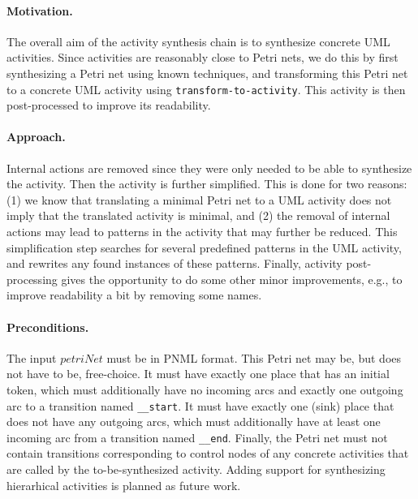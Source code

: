 \documentclass{article}
\newcommand{\keyw}[1]{\texttt{#1}}
\newcommand{\var}[1]{\ensuremath{\mathit{#1}}}
\newcommand{\transformToActivityLabel}[0]{\keyw{transform-to-activity}}
\newcommand{\startLabel}[0]{\texttt{\_\_start}}
\newcommand{\stopLabel}[0]{\texttt{\_\_end}} %
\theoremstyle{definition}
\begin{document}
\paragraph{Motivation.}
The overall aim of the activity synthesis chain is to synthesize concrete UML activities.
Since activities are reasonably close to Petri nets, we do this by first synthesizing a Petri net using known techniques, and transforming this Petri net to a concrete UML activity using \transformToActivityLabel{}.
This activity is then post-processed to improve its readability.

\paragraph{Approach.}
Internal actions are removed since they were only needed to be able to synthesize the activity.
Then the activity is further simplified.
This is done for two reasons: (1) we know that translating a minimal Petri net to a UML activity does not imply that the translated activity is minimal, and (2) the removal of internal actions may lead to patterns in the activity that may further be reduced.
This simplification step searches for several predefined patterns in the UML activity, and rewrites any found instances of these patterns.
Finally, activity post-processing gives the opportunity to do some other minor improvements, e.g., to improve readability a bit by removing some names.

\paragraph{Preconditions.}
The input \var{petriNet} must be in PNML format.
This Petri net may be, but does not have to be, free-choice.
It must have exactly one place that has an initial token, which must additionally have no incoming arcs and exactly one outgoing arc to a transition named \startLabel{}.
It must have exactly one (sink) place that does not have any outgoing arcs, which must additionally have at least one incoming arc from a transition named \stopLabel{}.
Finally, the Petri net must not contain transitions corresponding to control nodes of any concrete activities that are called by the to-be-synthesized activity.
Adding support for synthesizing hierarhical activities is planned as future work.
\end{document}
